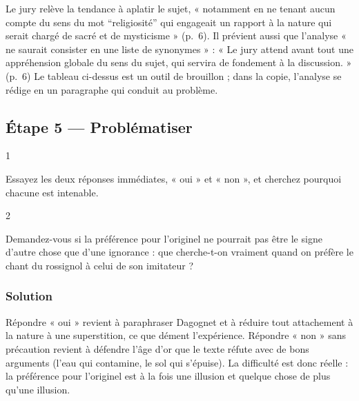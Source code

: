 \documentclass[11pt,a4paper]{article}
\begin{document}
\begin{jury}

Le jury relève la tendance à aplatir le sujet, « notamment en ne tenant aucun compte du sens du mot ``religiosité'' qui engageait un rapport à la nature qui serait chargé de sacré et de mysticisme » (p.~6). Il prévient aussi que l'analyse « ne saurait consister en une liste de synonymes » : « Le jury attend avant tout une appréhension globale du sens du sujet, qui servira de fondement à la discussion. » (p.~6) Le tableau ci-dessus est un outil de brouillon ; dans la copie, l'analyse se rédige en un paragraphe qui conduit au problème.

\end{jury}

\hypertarget{uxe9tape-5-probluxe9matiser}{%
\subsection{Étape 5 --- Problématiser}\label{uxe9tape-5-probluxe9matiser}}

\begin{indication}{1}

Essayez les deux réponses immédiates, « oui » et « non », et cherchez pourquoi chacune est intenable.

\end{indication}

\begin{indication}{2}

Demandez-vous si la préférence pour l'originel ne pourrait pas être le signe d'autre chose que d'une ignorance : que cherche-t-on vraiment quand on préfère le chant du rossignol à celui de son imitateur ?

\end{indication}

\hypertarget{solution-4}{%
\subsubsection{Solution}\label{solution-4}}

Répondre « oui » revient à paraphraser Dagognet et à réduire tout attachement à la nature à une superstition, ce que dément l'expérience. Répondre « non » sans précaution revient à défendre l'âge d'or que le texte réfute avec de bons arguments (l'eau qui contamine, le sol qui s'épuise). La difficulté est donc réelle : la préférence pour l'originel est à la fois une illusion et quelque chose de plus qu'une illusion.
\end{document}
